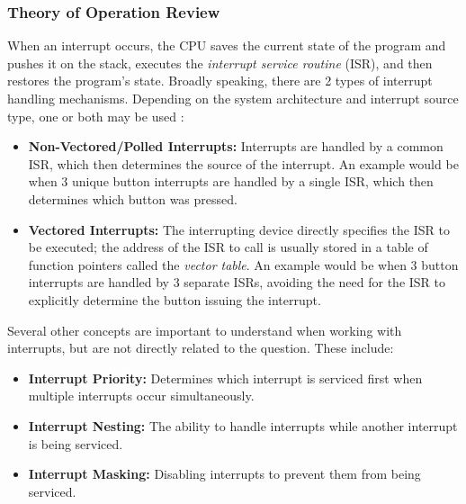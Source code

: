 \documentclass[main.tex]{subfiles}
\begin{document}
\subsubsection{Theory of Operation Review}
When an interrupt occurs, the CPU saves the current state of the program and pushes it on the stack, executes the \textit{interrupt service routine} (ISR), and then restores the program's state. \cite{white2024}
\newline
\newnoindentpara Broadly speaking, there are 2 types of interrupt handling mechanisms. Depending on the system architecture and interrupt source type, one or both may be used \cite{myersInterrupts}:
\begin{itemize}
    \item \textbf{Non-Vectored/Polled Interrupts:} Interrupts are handled by a common ISR, which then determines the source of the interrupt. An example would be when 3 unique button interrupts are handled by a single ISR, which then determines which button was pressed.
    \item \textbf{Vectored Interrupts:} The interrupting device directly specifies the ISR to be executed; the address of the ISR to call is usually stored in a table of function pointers called the \textit{vector table}. An example would be when 3 button interrupts are handled by 3 separate ISRs, avoiding the need for the ISR to explicitly determine the button issuing the interrupt.
\end{itemize}

\newnoindentpara Several other concepts are important to understand when working with interrupts, but are not directly related to the question. These include:
\begin{itemize}
    \item \textbf{Interrupt Priority:} Determines which interrupt is serviced first when multiple interrupts occur simultaneously.
    \item \textbf{Interrupt Nesting:} The ability to handle interrupts while another interrupt is being serviced.
    \item \textbf{Interrupt Masking:} Disabling interrupts to prevent them from being serviced.
\end{itemize}
\end{document}
